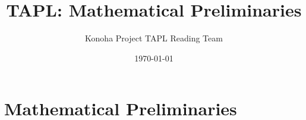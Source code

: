 \documentclass[12pt]{jsbook}
\title{TAPL: Mathematical Preliminaries}
\author{Konoha Project TAPL Reading Team}
\date{\today}
\begin{document}
\setcounter{chapter}{1}
\chapter{Mathematical Preliminaries}





\end{document}
